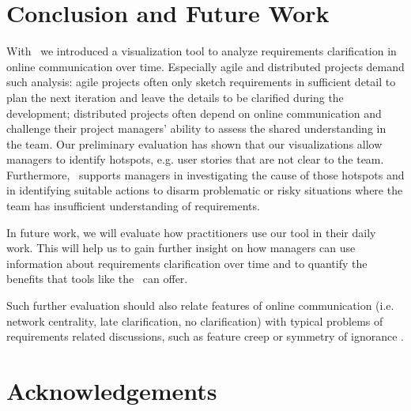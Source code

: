 \section{Conclusion and Future Work}
With \viss\ we introduced a visualization tool to analyze requirements clarification in online communication over time.
Especially agile and distributed projects demand such analysis: agile projects often only sketch requirements in sufficient detail to plan the next iteration and leave the details to be clarified during the development; distributed projects often depend on online communication and challenge their project managers' ability to assess the shared understanding in the team. 
Our preliminary evaluation has shown that our visualizations allow managers to identify hotspots, e.g. user stories that are not clear to the team. 
Furthermore, \viss\ supports managers in investigating the cause of those hotspots and in identifying suitable actions to disarm problematic or risky situations where the team has insufficient understanding of requirements.
 
In future work, we will evaluate how practitioners use our tool in their daily work. 
This will help us to gain further insight on how managers can use information about requirements clarification over time and to quantify the benefits that tools like the \viss\ can offer.

Such further evaluation should also relate features of online communication (i.e. network centrality, late clarification, no clarification) with typical problems of requirements related discussions, such as feature creep \cite{Jones1996} or symmetry of ignorance \cite{Fischer2000}.

\section*{Acknowledgements}
